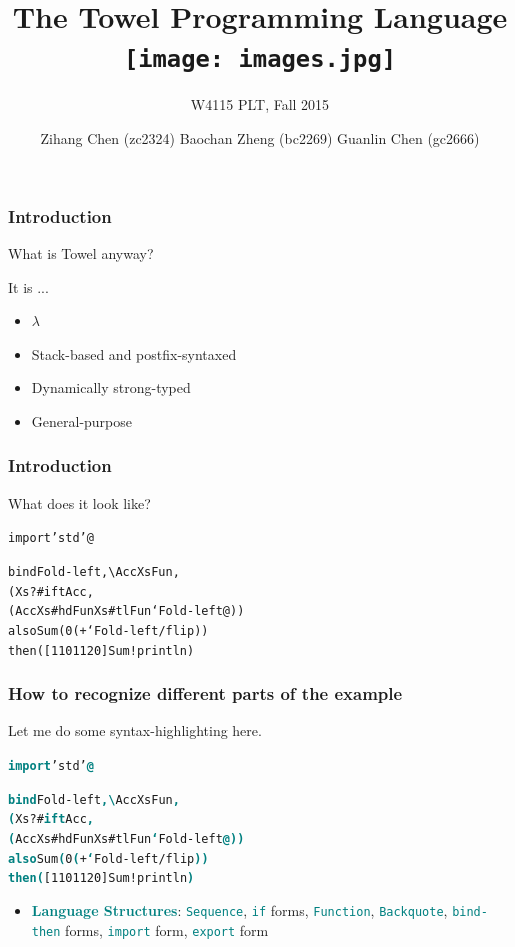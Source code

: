 \documentclass[10pt, compress, handout]{beamer}
\title{The Towel Programming Language \texttt{[image: images.jpg]}}
\subtitle{W4115 PLT, Fall 2015}
\author{Zihang Chen (zc2324) Baochan Zheng (bc2269) Guanlin Chen (gc2666)}
\institute{Columbia University}
\newcommand{\sst}[1]{\textcolor{teal}{\textbf{#1}}}
\newcommand{\ltt}[1]{\textcolor{violet}{\textbf{#1}}}
\newcommand{\nmt}[1]{\textcolor{orange}{\textbf{#1}}}
\newcommand{\msst}[1]{\textcolor{teal}{\texttt{#1}}}
\begin{document}
\maketitle

\begin{frame}[fragile]
\frametitle{Introduction}
What is Towel anyway?

\pause
It is ...
\begin{itemize}[<+->]
\item $\lambda$ 
\item Stack-based and postfix-syntaxed
\item Dynamically strong-typed
\item General-purpose
  \onslide<+->{\begin{alltt}
    \ltt{42} \nmt{!println}
\end{alltt}}
\end{itemize}
\end{frame}

\begin{frame}[fragile]
  \frametitle{Introduction}
  What does it look like?

\pause
  \begin{mdframed}
\begin{alltt}
  import 'std' @

  bind Fold-left ,\textbackslash Acc Xs Fun,
    (Xs ?# ift Acc,
       (Acc Xs #hd Fun Xs #tl Fun` Fold-left@))
  also Sum (0 (+` Fold-left /flip))
  then ([1 10 11 20] Sum !println)
\end{alltt}
  \end{mdframed}
\end{frame}

\begin{frame}[fragile]
  \frametitle{How to recognize different parts of the example}

  Let me do some syntax-highlighting here.

\pause
  \begin{alltt}
  \sst{import} 'std' \sst{@}

  \sst{bind} Fold-left \sst{,\textbackslash} Acc Xs Fun\sst{,}
    \sst{(}Xs ?# \sst{ift} Acc\sst{,}
       \sst{(}Acc Xs #hd Fun Xs #tl Fun\sst{`} Fold-left\sst{@))}
  \sst{also} Sum \sst{(}0 \sst{(}+\sst{`} Fold-left /flip\sst{))}
  \sst{then} \sst{(}[1 10 11 20] Sum !println\sst{)}
  \end{alltt}
\vspace{0.5cm}

  \begin{itemize}
  \item \sst{Language Structures}:
\small
\msst{Sequence}, \msst{if} forms, \msst{Function}, \msst{Backquote}, \msst{bind-then} forms, \msst{import} form, \msst{export} form
\normalsize
  \end{itemize}
\vspace{0.3cm}

\end{frame}
\end{document}

